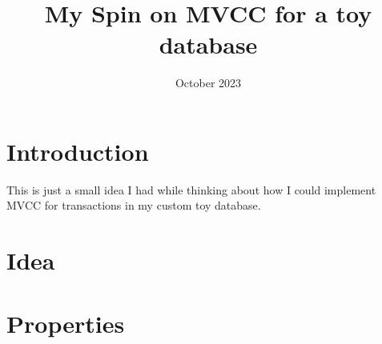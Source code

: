 \documentclass[a4paper, 11pt]{article}
\title{My Spin on MVCC for a toy database}
\date{October 2023}
\begin{document}
\section{Introduction}
This is just a small idea I had while thinking about how I could implement MVCC for transactions in my custom
toy database.

\section{Idea}

\section{Properties}
\end{document}
